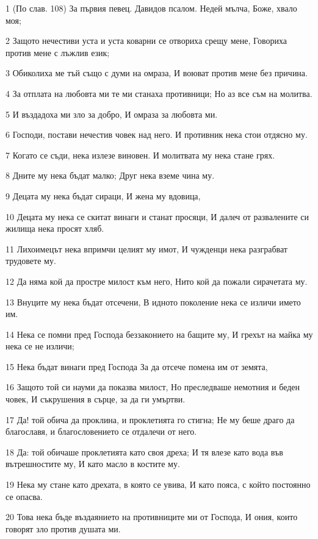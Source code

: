 \par 1 (По слав. 108) За първия певец. Давидов псалом. Недей мълча, Боже, хвало моя;
\par 2 Защото нечестиви уста и уста коварни се отвориха срещу мене, Говориха против мене с лъжлив език;
\par 3 Обиколиха ме тъй също с думи на омраза, И воюват против мене без причина.
\par 4 За отплата на любовта ми те ми станаха противници; Но аз все съм на молитва.
\par 5 И въздадоха ми зло за добро, И омраза за любовта ми.
\par 6 Господи, постави нечестив човек над него. И противник нека стои отдясно му.
\par 7 Когато се съди, нека излезе виновен. И молитвата му нека стане грях.
\par 8 Дните му нека бъдат малко; Друг нека вземе чина му.
\par 9 Децата му нека бъдат сираци, И жена му вдовица,
\par 10 Децата му нека се скитат винаги и станат просяци, И далеч от развалените си жилища нека просят хляб.
\par 11 Лихоимецът нека впримчи целият му имот, И чужденци нека разграбват трудовете му.
\par 12 Да няма кой да простре милост към него, Нито кой да пожали сирачетата му.
\par 13 Внуците му нека бъдат отсечени, В идното поколение нека се изличи името им.
\par 14 Нека се помни пред Господа беззаконието на бащите му, И грехът на майка му нека се не изличи;
\par 15 Нека бъдат винаги пред Господа За да отсече помена им от земята,
\par 16 Защото той си науми да показва милост, Но преследваше немотния и беден човек, И съкрушения в сърце, за да ги умъртви.
\par 17 Да! той обича да проклина, и проклетията го стигна; Не му беше драго да благославя, и благословението се отдалечи от него.
\par 18 Да: той обичаше проклетията като своя дреха; И тя влезе като вода във вътрешностите му, И като масло в костите му.
\par 19 Нека му стане като дрехата, в която се увива, И като пояса, с който постоянно се опасва.
\par 20 Това нека бъде въздаянието на противниците ми от Господа, И ония, които говорят зло против душата ми.
